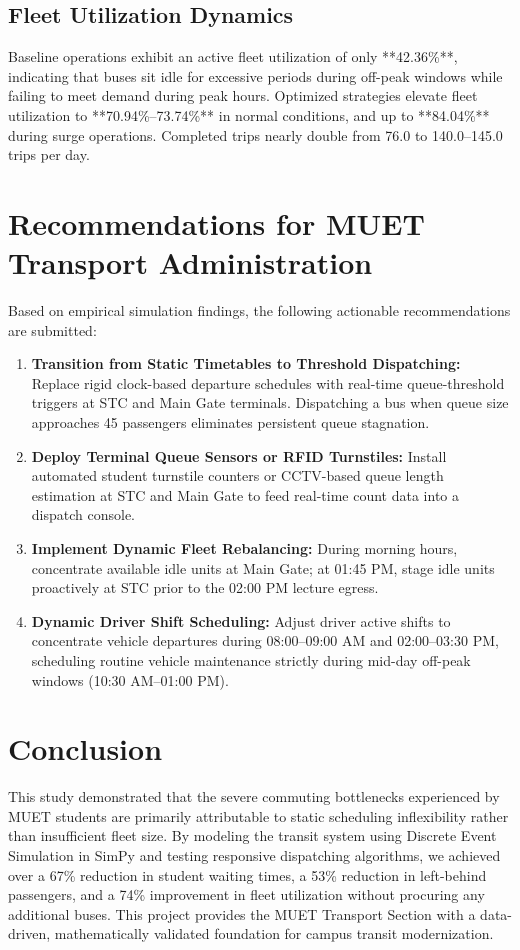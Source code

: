 \documentclass[conference]{IEEEtran}
\begin{document}
\subsection{Fleet Utilization Dynamics}
Baseline operations exhibit an active fleet utilization of only **42.36\%**, indicating that buses sit idle for excessive periods during off-peak windows while failing to meet demand during peak hours. Optimized strategies elevate fleet utilization to **70.94\%--73.74\%** in normal conditions, and up to **84.04\%** during surge operations. Completed trips nearly double from 76.0 to 140.0--145.0 trips per day.

\section{Recommendations for MUET Transport Administration}
Based on empirical simulation findings, the following actionable recommendations are submitted:
\begin{enumerate}
    \item \textbf{Transition from Static Timetables to Threshold Dispatching:} Replace rigid clock-based departure schedules with real-time queue-threshold triggers at STC and Main Gate terminals. Dispatching a bus when queue size approaches 45 passengers eliminates persistent queue stagnation.
    \item \textbf{Deploy Terminal Queue Sensors or RFID Turnstiles:} Install automated student turnstile counters or CCTV-based queue length estimation at STC and Main Gate to feed real-time count data into a dispatch console.
    \item \textbf{Implement Dynamic Fleet Rebalancing:} During morning hours, concentrate available idle units at Main Gate; at 01:45 PM, stage idle units proactively at STC prior to the 02:00 PM lecture egress.
    \item \textbf{Dynamic Driver Shift Scheduling:} Adjust driver active shifts to concentrate vehicle departures during 08:00--09:00 AM and 02:00--03:30 PM, scheduling routine vehicle maintenance strictly during mid-day off-peak windows (10:30 AM--01:00 PM).
\end{enumerate}

\section{Conclusion}
This study demonstrated that the severe commuting bottlenecks experienced by MUET students are primarily attributable to static scheduling inflexibility rather than insufficient fleet size. By modeling the transit system using Discrete Event Simulation in SimPy and testing responsive dispatching algorithms, we achieved over a 67\% reduction in student waiting times, a 53\% reduction in left-behind passengers, and a 74\% improvement in fleet utilization without procuring any additional buses. This project provides the MUET Transport Section with a data-driven, mathematically validated foundation for campus transit modernization.
\end{document}
